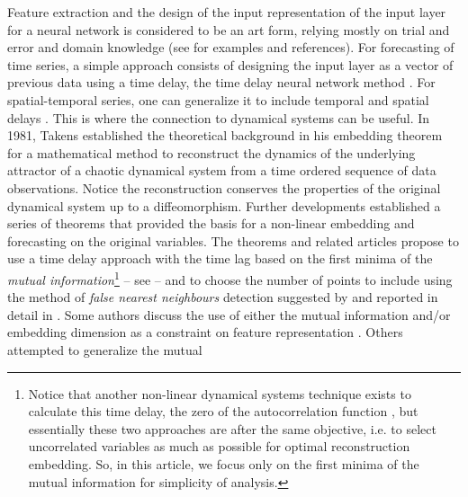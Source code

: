 \documentclass[journal]{IEEEtran}
\begin{document}
Feature extraction and the design of the input
representation of the 
input layer for a neural network is considered to be an art form, relying mostly on trial and error and domain knowledge (see \cite{5771385}
for examples and references). For 
forecasting of time series, a simple approach consists of designing the input layer as a vector of previous data using a time delay, the 
time delay neural network method \cite{Waibel:1990:PRU:108235.108263, luk2000study, 857903, Frank2001, OH2002249, 1009-1963-12-6-304, 
inputlayer}. For spatial-temporal series, one can generalize it to include temporal and spatial delays 
\cite{covas2016,covaspeixinhojoao}. This is where the connection to dynamical systems can be useful. In 1981, Takens established the 
theoretical background \cite{1981LNM...898..366T} in his embedding theorem for a mathematical method to reconstruct the dynamics 
of the underlying attractor of a chaotic dynamical system from a time ordered sequence of data observations. Notice the reconstruction 
conserves the properties of the original dynamical system up to a diffeomorphism. 
 Further developments established a series of theorems \cite{key1503303m, 1981LNM...898..230M, 1991JSP....65..579S}
 that provided the basis for a non-linear embedding and forecasting on the original variables. The 
theorems and related articles propose to use a time delay approach with the time lag based on the first minima of the 
{\em mutual information}\footnote{
Notice that another non-linear dynamical systems technique exists to calculate this time delay, the zero of the autocorrelation
function \cite{opac-b1092652,abarbanel1997analysis}, but essentially these two approaches are after the same objective, i.e.
to select uncorrelated 
 variables as much as possible for optimal reconstruction embedding. So, in this article, we focus only on the first minima
 of the mutual information for simplicity of analysis.
} -- see 
\cite{Fraser86, abarbanel1997analysis, opac-b1092652} -- and to choose the number of points to include using  the method of {\em false 
nearest neighbours} detection suggested by \cite{1992PhRvA..45.3403K} and reported in detail in \cite{1992PhRvA..45.7058M, 
1993RvMP...65.1331A, 1996PhT....49k..86A, abarbanel1997analysis}. 
Some authors discuss the use of either the mutual information and/or embedding dimension as a constraint on feature representation
\cite{annunziato, Gkana201579, Zachilas2015, Sun2010109, HUANG20108590, 298224, Frank2001, 1998GeoRL..25..457K, 
BUHAMRA2003805, chandra2012cooperative, DBLP:journals/corr/MaslennikovaB14, sauter2010spatio, JiangS11, inputlayer, 1997IJMPC...8.1345K, 
1009-1963-12-6-304, Verdes2000, 1996SoPh..168..423F, 2007AdG....10...67L, Chandra:2012:CCE:2181341.2181747, raios, 
maass2003mathematical,0305-4470-28-12-012, 1995ApJ...444..916C, 1998GeoRL..25..457K, Zachilas2015, Chandra:2012:CCE:2181341.2181747, 
Gkana201579, raios}. Others \cite{Simon:2007:HDS:1230147.1230294} attempted to generalize the mutual 
\end{document}

